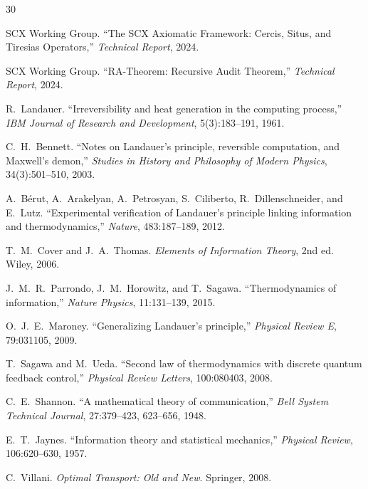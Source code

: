 \documentclass[12pt,a4paper]{article}
\begin{document}

\begin{thebibliography}{30}

SCX Working Group.
\newblock ``The SCX Axiomatic Framework: Cercis, Situs, and Tiresias
Operators,''
\newblock \emph{Technical Report}, 2024.

SCX Working Group.
\newblock ``RA-Theorem: Recursive Audit Theorem,''
\newblock \emph{Technical Report}, 2024.

R.~Landauer.
\newblock ``Irreversibility and heat generation in the computing process,''
\newblock \emph{IBM Journal of Research and Development}, 5(3):183--191, 1961.

C.~H.~Bennett.
\newblock ``Notes on Landauer's principle, reversible computation, and
Maxwell's demon,''
\newblock \emph{Studies in History and Philosophy of Modern Physics},
34(3):501--510, 2003.

A.~B\'erut, A.~Arakelyan, A.~Petrosyan, S.~Ciliberto, R.~Dillenschneider,
and E.~Lutz.
\newblock ``Experimental verification of Landauer's principle linking
information and thermodynamics,''
\newblock \emph{Nature}, 483:187--189, 2012.

T.~M.~Cover and J.~A.~Thomas.
\newblock \emph{Elements of Information Theory}, 2nd ed.
\newblock Wiley, 2006.

J.~M.~R.~Parrondo, J.~M.~Horowitz, and T.~Sagawa.
\newblock ``Thermodynamics of information,''
\newblock \emph{Nature Physics}, 11:131--139, 2015.

O.~J.~E.~Maroney.
\newblock ``Generalizing Landauer's principle,''
\newblock \emph{Physical Review E}, 79:031105, 2009.

T.~Sagawa and M.~Ueda.
\newblock ``Second law of thermodynamics with discrete quantum feedback
control,''
\newblock \emph{Physical Review Letters}, 100:080403, 2008.

C.~E.~Shannon.
\newblock ``A mathematical theory of communication,''
\newblock \emph{Bell System Technical Journal}, 27:379--423, 623--656, 1948.

E.~T.~Jaynes.
\newblock ``Information theory and statistical mechanics,''
\newblock \emph{Physical Review}, 106:620--630, 1957.

C.~Villani.
\newblock \emph{Optimal Transport: Old and New}.
\newblock Springer, 2008.

\end{thebibliography}
\end{document}
